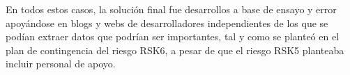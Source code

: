 \documentclass{subfiles}
\begin{document}
\begin{itemize}
    \end{itemize}

    En todos estos casos, la solución final fue desarrollos a base de ensayo y error apoyándose en blogs y webs de desarrolladores independientes de los que se podían extraer datos que podrían ser importantes, tal y como se planteó en el plan de contingencia del riesgo RSK6, a pesar de que el riesgo RSK5 planteaba incluir personal de apoyo.
\end{document}
